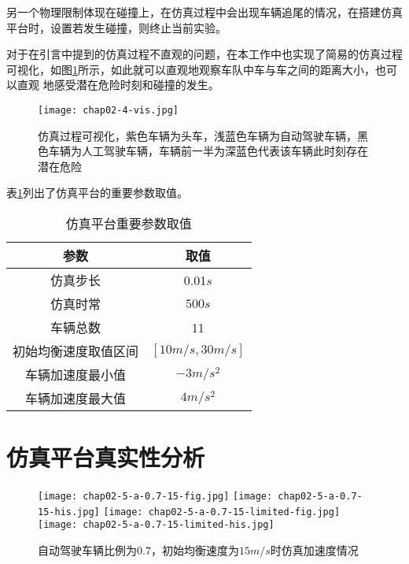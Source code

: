 另一个物理限制体现在碰撞上，在仿真过程中会出现车辆追尾的情况，在搭建仿真平台时，设置若发生碰撞，则终止当前实验。

对于在引言中提到的仿真过程不直观的问题，在本工作中也实现了简易的仿真过程可视化，如图\ref{fig:chap02-4-vis}所示，如此就可以直观地观察车队中车与车之间的距离大小，也可以直观
地感受潜在危险时刻和碰撞的发生。

\begin{figure}
  \centering
  \texttt{[image: chap02-4-vis.jpg]}
  \caption{仿真过程可视化，紫色车辆为头车，浅蓝色车辆为自动驾驶车辆，黑色车辆为人工驾驶车辆，车辆前一半为深蓝色代表该车辆此时刻存在潜在危险}
  \label{fig:chap02-4-vis}
\end{figure}

表\ref{tab:chap02-3}列出了仿真平台的重要参数取值。

\begin{table}
  \centering
  \caption{仿真平台重要参数取值}
  \begin{tabular}{cc}
    \toprule
    参数                   &  取值                         \\
    \midrule
    仿真步长                & 0.01$s$         \\
    仿真时常                & $500s$             \\
    车辆总数                & 11              \\
    初始均衡速度取值区间      & $[10m/s, 30m/s]$        \\
    车辆加速度最小值         & $-3m/s^2$     \\
    车辆加速度最大值         & $4m/s^2$ \\
    \bottomrule
  \end{tabular}
  \label{tab:chap02-3}
\end{table}

\section{仿真平台真实性分析}

\begin{figure}
  \centering
    {\texttt{[image: chap02-5-a-0.7-15-fig.jpg]}}
    {\texttt{[image: chap02-5-a-0.7-15-his.jpg]}}
    {\texttt{[image: chap02-5-a-0.7-15-limited-fig.jpg]}}
    {\texttt{[image: chap02-5-a-0.7-15-limited-his.jpg]}}
  \caption{自动驾驶车辆比例为$0.7$，初始均衡速度为$15m/s$时仿真加速度情况}
  \label{fig:chap02-5-a}
\end{figure}

